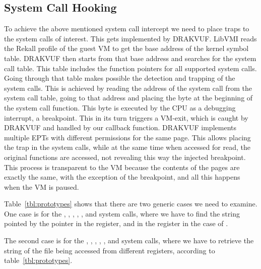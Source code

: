 \begin{table}[ht]
\begin{tabular}{ccccccc}
	\bottomrule
\end{tabular}
\end{table}

\subsection{System Call Hooking}\label{sub:hooking}

To achieve the above mentioned system call intercept we need to place traps to the system calls of interest. This gets implemented by DRAKVUF. LibVMI reads the Rekall profile of the guest \ac{VM} to get the base address of the kernel symbol table. DRAKVUF then starts from that base address and searches for the system call table. This table includes the function pointers for all supported system calls. Going through that table makes possible the detection and trapping of the system calls.  This is achieved by reading the address of the system call from the system call table, going to that address and placing the  byte at the beginning of the system call function. This byte is executed by the \ac{CPU} as a debugging interrupt, a breakpoint. This in its turn triggers a VM-exit, which is caught by DRAKVUF and handled by our callback function. DRAKVUF implements multiple \ac{EPT}s with different permissions for the same page. This allows placing the trap in the system calls, while at the same time when accessed for read, the original functions are accessed, not revealing this way the injected breakpoint. This process is transparent to the \ac{VM} because the contents of the pages are exactly the same, with the exception of the breakpoint, and all this happens when the \ac{VM} is paused.

\par Table~\ref{tbl:prototypes} shows that there are two generic cases we need to examine. One case is for the , , , , , and  system calls, where we have to find the string pointed by the pointer in the  register, and in the  register in the case of . 

\par The second case is for the , , , , , and  system calls, where we have to retrieve the string of the file being accessed from different registers, according to table~\ref{tbl:prototypes}. 

